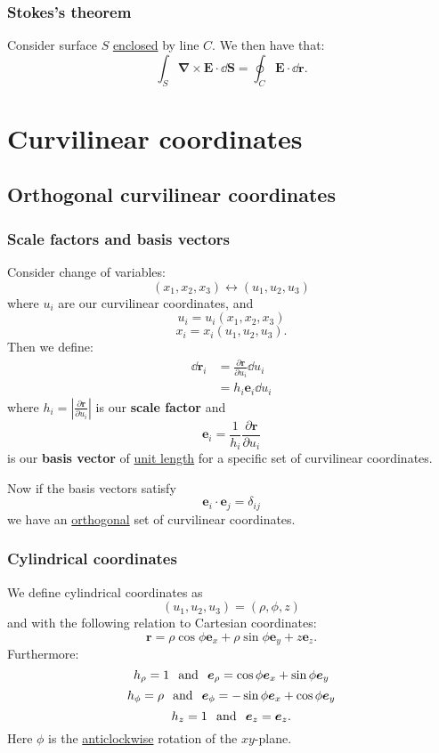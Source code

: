 \documentclass{article}
\begin{document}
\subsubsection{Stokes's theorem}
Consider surface $S$ \underline{enclosed}
by line $C$. We then have that:
$$\int_S\boldsymbol{\nabla}\times\boldsymbol{E}\cdot
\dd\boldsymbol{S}=
\oint_C\boldsymbol{E}\cdot\dd\boldsymbol{r}.$$

\newpage

\section{Curvilinear coordinates}

\subsection{Orthogonal curvilinear coordinates}

\subsubsection{Scale factors and basis vectors}
Consider change of variables:
$$(x_1,x_2,x_3)\leftrightarrow(u_1,u_2,u_3)$$
where $u_i$ are our curvilinear coordinates, and
$$u_i=u_i(x_1,x_2,x_3)$$
$$x_i=x_i(u_1,u_2,u_3).$$
Then we define:
\begin{align*}
    \dd\boldsymbol{r}_i
    &=\frac{\partial\boldsymbol{r}}{\partial u_i}\dd u_i \\
    &=h_i\boldsymbol{e}_i \dd u_i
\end{align*}
where $h_i=|\displaystyle\frac{\partial\boldsymbol{r}}{\partial u_i}|$ is our \textbf{scale factor} and 
$$\boldsymbol{e}_i=\frac{1}{h_i}\frac{\partial\boldsymbol{r}}{\partial u_i}$$
is our \textbf{basis vector} of \underline{unit length} for a specific set of curvilinear coordinates.

Now if the basis vectors satisfy
$$\boldsymbol{e}_i\cdot\boldsymbol{e}_j=\delta_{ij}$$
we have an \underline{orthogonal} set of curvilinear coordinates.

\subsubsection{Cylindrical coordinates}
We define cylindrical coordinates as
$$(u_1,u_2,u_3)=(\rho,\phi,z)$$
and with the following relation to Cartesian coordinates:
$$\boldsymbol{r}=\rho\cos\phi\boldsymbol{e}_x
+\rho\sin\phi\boldsymbol{e}_y+z\boldsymbol{e}_z.$$
Furthermore:
$$h_{\rho}=1\hspace{0.1in}\text{and}\hspace{0.1in}\boldsymbol{e}_{\rho}=\cos\phi\boldsymbol{e}_{x}
+\sin\phi\boldsymbol{e}_{y}$$
$$h_{\phi}=\rho\hspace{0.1in}\text{and}\hspace{0.1in}
\boldsymbol{e}_{\phi}=-\sin\phi\boldsymbol{e}_x+\cos\phi\boldsymbol{e}_y$$
$$h_{z}=1\hspace{0.1in}\text{and}\hspace{0.1in}\boldsymbol{e}_z=\boldsymbol{e}_z.$$
Here $\phi$ is the \underline{anticlockwise} rotation of the $xy$-plane.
\end{document}
